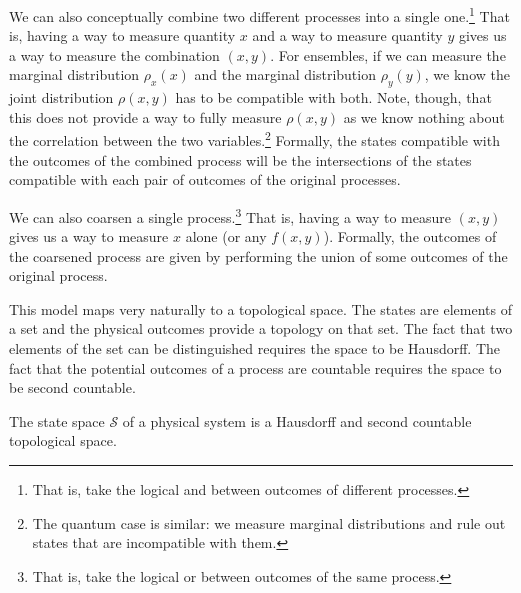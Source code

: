 \documentclass[smallextended]{svjour3}
\numberwithin{equation}{section}
\begin{document}
We can also conceptually combine two different processes into a single one.\footnote{That is, take the logical and between outcomes of different processes.} That is, having a way to measure quantity $x$ and a way to measure quantity $y$ gives us a way to measure the combination $(x,y)$. For ensembles, if we can measure the marginal distribution $\rho_x(x)$ and the marginal distribution $\rho_y(y)$, we know the joint distribution $\rho(x,y)$ has to be compatible with both. Note, though, that this does not provide a way to fully measure $\rho(x,y)$ as we know nothing about the correlation between the two variables.\footnote{The quantum case is similar: we measure marginal distributions and rule out states that are incompatible with them.} Formally, the states compatible with the outcomes of the combined process will be the intersections of the states compatible with each pair of outcomes of the original processes.

We can also coarsen a single process.\footnote{That is, take the logical or between outcomes of the same process.} That is, having a way to measure $(x,y)$ gives us a way to measure $x$ alone (or any $f(x,y)$). Formally, the outcomes of the coarsened process are given by performing the union of some outcomes of the original process.

This model maps very naturally to a topological space. The states are elements of a set and the physical outcomes provide a topology on that set. The fact that two elements of the set can be distinguished requires the space to be Hausdorff. The fact that the potential outcomes of a process are countable requires the space to be second countable.

\begin{prop}\label{prop:state_topology}
The state space $\mathcal{S}$ of a physical system is a Hausdorff and second countable topological space.
\end{prop}
\end{document}
